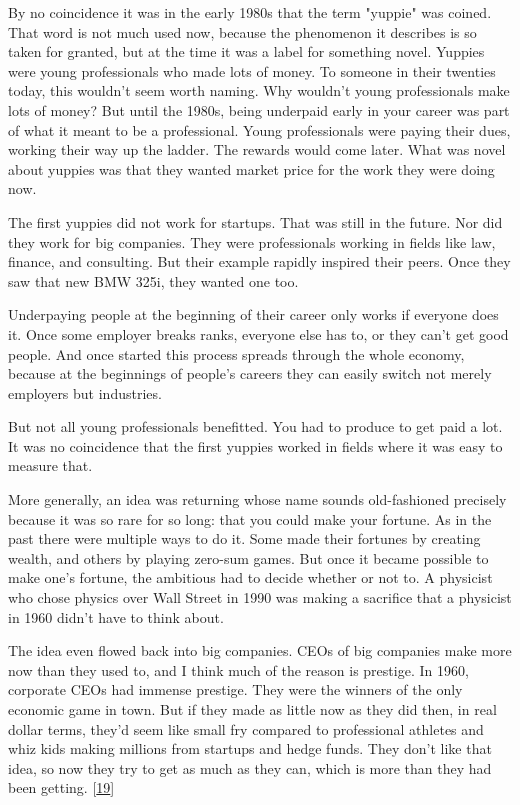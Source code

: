 By no coincidence it was in the early 1980s that the term "yuppie"
was coined.  That word is not much used now, because the phenomenon
it describes is so taken for granted, but at the time it was a label
for something novel. Yuppies were young professionals who made lots
of money.  To someone in their twenties today, this wouldn't seem
worth naming.  Why wouldn't young professionals make lots of money?
But until the 1980s, being underpaid early in your career was part
of what it meant to be a professional.  Young professionals were
paying their dues, working their way up the ladder.  The rewards
would come later.  What was novel about yuppies was that they wanted
market price for the work they were doing now.

The first yuppies did not work for startups. That was still in the
future.  Nor did they work for big companies. They were professionals
working in fields like law, finance, and consulting.  But their example 
rapidly inspired their peers.  Once they saw that new BMW 325i, they 
wanted one too.

Underpaying people at the beginning of their career only works if
everyone does it. Once some employer breaks ranks, everyone else
has to, or they can't get good people.  And once started this process
spreads through the whole economy, because at the beginnings of
people's careers they can easily switch not merely employers but
industries.

But not all young professionals benefitted. You had to produce to
get paid a lot.  It was no coincidence that the first yuppies worked
in fields where it was easy to measure that.

More generally, an idea was returning whose name sounds old-fashioned
precisely because it was so rare for so long: that you could make
your fortune.  As in the past there were multiple ways to do it.
Some made their fortunes by creating wealth, and others by playing
zero-sum games. But once it became possible to make one's fortune,
the ambitious had to decide whether or not to.  A physicist who
chose physics over Wall Street in 1990 was making a sacrifice that
a physicist in 1960 didn't have to think about.

The idea even flowed back into big companies.  CEOs of big companies
make more now than they used to, and I think much of the reason is
prestige.  In 1960, corporate CEOs had immense prestige.  They were
the winners of the only economic game in town. But if they made as
little now as they did then, in real dollar terms, they'd seem like
small fry compared to professional athletes and whiz kids making
millions from startups and hedge funds. They don't like that idea,
so now they try to get as much as they can, which is more than they
had been getting. 
[\href{\#f19n}{19}]

